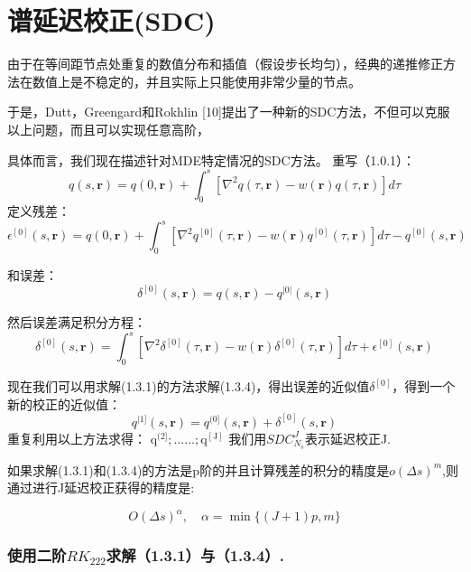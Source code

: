 \section{谱延迟校正(SDC)}
由于在等间距节点处重复的数值分布和插值（假设步长均匀），经典的递推修正方法在数值上是不稳定的，并且实际上只能使用非常少量的节点。

于是，Dutt，Greengard和Rokhlin [10]提出了一种新的SDC方法，不但可以克服以上问题，而且可以实现任意高阶，

具体而言，我们现在描述针对MDE特定情况的SDC方法。
重写（1.0.1）：
\begin{equation}
q(s, \mathbf{r})=q(0, \mathbf{r})+\int_{0}^{s}\left[\nabla^{2} q(\tau, \mathbf{r})-w(\mathbf{r}) q(\tau, \mathbf{r})\right] d \tau
\end{equation}
定义残差：
\begin{equation}
\epsilon^{[0]}(s, \mathbf{r})=q(0, \mathbf{r})+\int_{0}^{s}\left[\nabla^{2} q^{[0]}(\tau, \mathbf{r})-w(\mathbf{r}) q^{[0]}(\tau, \mathbf{r})\right] d \tau-q^{[0]}(s, \mathbf{r})
\end{equation}

和误差：
\begin{equation}
\delta^{[0]}(s, \mathbf{r})=q(s, \mathbf{r})-q^{|0|}(s, \mathbf{r})
\end{equation}

然后误差满足积分方程：
\begin{equation}
\delta^{[0]}(s, \mathbf{r})=\int_{0}^{s}\left[\nabla^{2} \delta^{[0]}(\tau, \mathbf{r})-w(\mathbf{r}) \delta^{[0]}(\tau, \mathbf{r})\right] d \tau+\epsilon^{[0]}(s, \mathbf{r})
\end{equation}

现在我们可以用求解(1.3.1)的方法求解(1.3.4)，得出误差的近似值$\delta^{[0]}$，得到一个新的校正的近似值：
\begin{equation}
q^{ | 1 ]}(s, \mathbf{r})=q^{(0]}(s, \mathbf{r})+\delta^{[0]}(s, \mathbf{r})
\end{equation}
重复利用以上方法求得：
$\mathrm{q}^{(2]} ; \ldots \ldots ; \mathrm{q}^{[\mathrm{J}]}$
我们用$SDC_{N_s}^J$表示延迟校正J.

如果求解(1.3.1)和(1.3.4)的方法是p阶的并且计算残差的积分的精度是$o(\Delta s)^{m}$,则通过进行J延迟校正获得的精度是:

\begin{equation}
O(\Delta s)^{\alpha}, \quad \alpha=\min \{(J+1) p, m\}
\end{equation}

\subsubsection{使用二阶$RK_{222}$求解（1.3.1）与（1.3.4）.}

